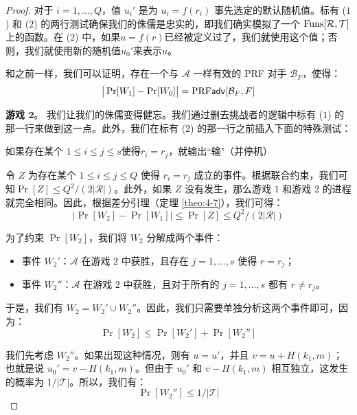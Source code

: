 \begin{proof}
\vspace{5pt}

\noindent
对于 $i=1,\dots,Q$，值 $u_i'$ 是为 $u_i=f(r_i)$ 事先选定的默认随机值。标有 ($1$) 和 ($2$) 的两行测试确保我们的侏儒是忠实的，即我们确实模拟了一个 ${\rm Funs}[\mathcal{R},\mathcal{T}]$ 上的函数。在 ($2$) 中，如果$u=f(r)$已经被定义过了，我们就使用这个值；否则，我们就使用新的随机值$u_0'$来表示$u$。

和之前一样，我们可以证明，存在一个与 $\mathcal{A}$ 一样有效的 PRF 对手 $\mathcal{B}_F$，使得：
\begin{equation}\label{eq:7-26}
\big\lvert\Pr[W_1]-\Pr[W_0]\big\rvert={\rm PRF}\mathsf{adv}[\mathcal{B}_F,F]
\end{equation}

\noindent\textbf{游戏 $\mathbf{2}$}。
我们让我们的侏儒变得健忘。我们通过删去挑战者的逻辑中标有 ($1$) 的那一行来做到这一点。此外，我们在标有 ($2$) 的那一行之前插入下面的特殊测试：

\vspace{5pt}

\hspace*{29pt} 如果存在某个 $1\leq i\leq j\leq s$使得$r_i=r_j$，就输出``输"（并停机）

\vspace{5pt}

\noindent
令 $Z$ 为存在某个 $1\leq i\leq j\leq Q$ 使得 $r_i=r_j$ 成立的事件。根据联合约束，我们可知$\Pr[Z]\leq{Q^2}/{(2|\mathcal{R}|)}$。此外，如果 $Z$ 没有发生，那么游戏 $1$ 和游戏 $2$ 的进程就完全相同。因此，根据差分引理（定理 \ref{theo:4-7}），我们可得：
\begin{equation}\label{eq:7-27}
\big\lvert\Pr[W_2]-\Pr[W_1]\big\rvert\leq\Pr[Z]\leq{Q^2}/{(2|\mathcal{R}|)}
\end{equation}

为了约束 $\Pr[W_2]$，我们将 $W_2$ 分解成两个事件：
\begin{itemize}
	\item 事件 $W_2'$：$\mathcal{A}$ 在游戏 $2$ 中获胜，且存在 $j=1,\dots,s$ 使得 $r=r_j$；
	\item 事件 $W_2''$：$\mathcal{A}$ 在游戏 $2$ 中获胜，且对于所有的 $j=1,\dots,s$ 都有 $r\neq r_j$。
\end{itemize}
于是，我们有 $W_2=W_2'\cup W_2''$。因此，我们只需要单独分析这两个事件即可，因为：
\begin{equation}\label{eq:7-28}
\Pr[W_2]\leq\Pr[W_2']+\Pr[W_2'']
\end{equation}

我们先考虑 $W_2''$。如果出现这种情况，则有 $u=u'$，并且 $v=u+H(k_1,m)$；也就是说 $u_0'=v-H(k_1,m)$。但由于 $u_0'$ 和 $v-H(k_1,m)$ 相互独立，这发生的概率为 ${1}/{|\mathcal{T}|}$。所以，我们有：
\begin{equation}\label{eq:7-29}
\Pr[W_2'']\leq{1}/{|\mathcal{T}|}
\end{equation}


\end{proof}
